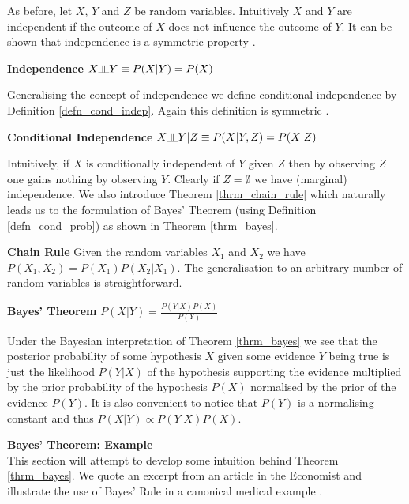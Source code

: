 \documentclass[../masters.tex]{subfiles}
\begin{document}
As before, let $X$, $Y$ and $Z$ be random variables. Intuitively $X$ and $Y$ are independent if the outcome of $X$ does not influence the outcome of $Y$. It can be shown that independence is a symmetric property \cite{koller}.
\begin{defn}
\textbf{Independence} $X \indep Y \equiv P(X|Y) = P(X)$ 
\label{defn_indep}
\end{defn}
Generalising the concept of independence we define conditional independence by Definition \ref{defn_cond_indep}. Again this definition is symmetric \cite{koller}.
\begin{defn}
\textbf{Conditional Independence} $X \indep Y | Z \equiv P(X|Y,Z) = P(X|Z)$
\label{defn_cond_indep}
\end{defn}
Intuitively, if $X$ is conditionally independent of $Y$ given $Z$ then by observing $Z$ one gains nothing by observing $Y$. Clearly if $Z=\emptyset$ we have (marginal) independence. We also introduce Theorem \ref{thrm_chain_rule} which naturally leads us to the formulation of Bayes' Theorem (using Definition \ref{defn_cond_prob}) as shown in Theorem \ref{thrm_bayes}. 
\begin{thrm}
\label{thrm_chain_rule}  
\textbf{Chain Rule} Given the random variables $X_1$ and $X_2$ we have $P(X_1,X_2) = P(X_1)P(X_2|X_1)$. The generalisation to an arbitrary number of random variables is straightforward.
\end{thrm}
\begin{thrm}
\textbf{Bayes' Theorem} $P(X|Y) = \frac{P(Y|X)P(X)}{P(Y)}$
\label{thrm_bayes}
\end{thrm}
Under the Bayesian interpretation of Theorem \ref{thrm_bayes} we see that the posterior probability of some hypothesis $X$ given some evidence $Y$ being true is just the likelihood $P(Y|X)$ of the hypothesis supporting the evidence multiplied by the prior probability of the hypothesis $P(X)$ normalised by the prior of the evidence $P(Y)$. It is also convenient to notice that $P(Y)$ is a normalising constant and thus  $P(X|Y) \propto P(Y|X)P(X)$.

\textbf{Bayes' Theorem: Example}\\
This section will attempt to develop some intuition behind Theorem \ref{thrm_bayes}. We quote an excerpt from an article in the Economist \cite{eco1} and illustrate the use of Bayes' Rule in a canonical medical example \cite{korb}.
\end{document}
